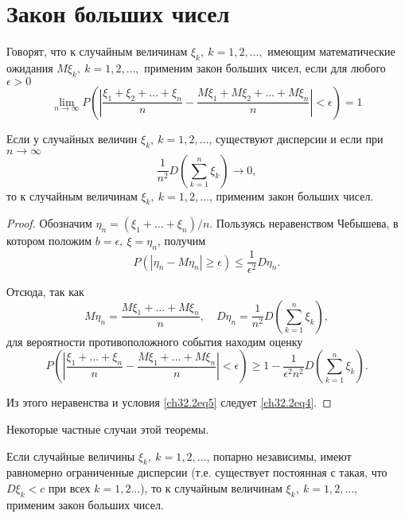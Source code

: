 \section{Закон больших чисел}

Говорят, что к случайным величинам $\xi_k, \: k = 1, 2, \ldots,$ имеющим математические ожидания $M\xi_k, \: k = 1, 2,\ldots,$ применим закон больших чисел, если для любого $\epsilon > 0$
\begin{equation} \label{ch32.2eq4}
\lim_{n \to \infty} P \left( \left| \frac{\xi_1 + \xi_2 + \ldots + \xi_n}{n} - \frac{M \xi_1 + M \xi_2 + \ldots + M \xi_n}{n} \right| < \epsilon \right) = 1
\end{equation}

\begin{thm} [Маркова]
Если у случайных величин $\xi_k, \: k = 1,2,\ldots$, существуют дисперсии и если при $n \to \infty$
\begin{equation} \label{ch32.2eq5}
\frac{1}{n^2} D  \left( \sum_{k  = 1}^{n} \xi_k\right) \to 0,
\end{equation}
то к случайным величинам $\xi_k, \: k = 1,2,\ldots$, применим закон больших чисел.
\end{thm}

\begin{proof}
Обозначим $\eta_n = (\xi_1 + \ldots + \xi_n) / n$. Пользуясь неравенством Чебышева, в котором положим $b = \epsilon, \: \xi = \eta_n$, получим
$$
P \left( \left| \eta_n - M  \eta_n \right| \ge \epsilon \right) \le \frac{1}{\epsilon^2} D  \eta_n.
$$

Отсюда, так как
$$
M  \eta_n = \frac{M \xi_1 + \ldots + M \xi_n}{n}, \quad D \eta_n = \frac{1}{n^2} D  \left( \sum_{k  = 1}^{n} \xi_k\right),
$$ 
для вероятности противоположного события находим оценку
$$
P \left( \left| \frac{\xi_1 + \ldots + \xi_n}{n} - \frac{M \xi_1 + \ldots + M \xi_n}{n} \right| < \epsilon \right) \ge 1 - \frac{1}{\epsilon^2n^2} D  \left( \sum_{k  = 1}^{n} \xi_k\right).
$$

Из этого неравенства и условия \eqref{ch32.2eq5} следует \eqref{ch32.2eq4}.
\end{proof}

Некоторые частные случаи этой теоремы.

\begin{thm} [Чебышёва]\label{ch32.2T3}
Если случайные величины $\xi_k, \: k = 1,2,\ldots$, попарно независимы, имеют равномерно ограниченные дисперсии (т.е. существует постоянная с такая, что $D  \xi_k < c$ при всех $k = 1, 2\ldots$),	то к случайным величинам $\xi_k, \: k = 1,2,\ldots$, применим закон больших чисел.
\end{thm}

